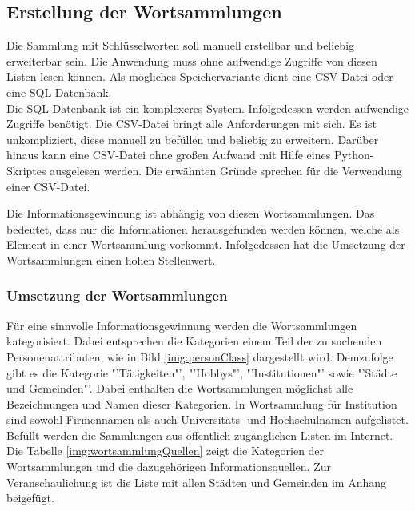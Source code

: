 	\subsection{Erstellung der Wortsammlungen}
	Die Sammlung mit Schlüsselworten soll manuell erstellbar und beliebig erweiterbar sein. Die Anwendung muss ohne aufwendige Zugriffe von diesen Listen lesen können. Als mögliches Speichervariante dient eine CSV-Datei oder eine SQL-Datenbank.\\
	Die SQL-Datenbank ist ein komplexeres System. Infolgedessen werden aufwendige Zugriffe benötigt. Die CSV-Datei bringt alle Anforderungen mit sich. Es ist unkompliziert, diese manuell zu befüllen und beliebig zu erweitern. Darüber hinaus kann eine CSV-Datei ohne großen Aufwand mit Hilfe eines Python-Skriptes ausgelesen werden. Die erwähnten Gründe sprechen für die Verwendung einer CSV-Datei.
	
	Die Informationsgewinnung ist abhängig von diesen Wortsammlungen. Das bedeutet, dass nur die Informationen herausgefunden werden können, welche als Element in einer Wortsammlung vorkommt. Infolgedessen hat die Umsetzung der Wortsammlungen einen hohen Stellenwert.
	
		
		\subsubsection{Umsetzung der Wortsammlungen}	
		Für eine sinnvolle Informationsgewinnung werden die Wortsammlungen kategorisiert. Dabei entsprechen die Kategorien einem Teil der zu suchenden Personenattributen, wie in Bild \ref{img:personClass} dargestellt wird. Demzufolge gibt es die Kategorie "'Tätigkeiten"', "'Hobbys"', "'Institutionen"' sowie "'Städte und Gemeinden"'. Dabei enthalten die Wortsammlungen möglichst alle Bezeichnungen und Namen dieser Kategorien. 
		In Wortsammlung für Institution sind sowohl Firmennamen als auch Universitäts- und Hochschulnamen aufgelistet. Befüllt werden die Sammlungen aus öffentlich zugänglichen Listen im Internet. Die Tabelle \ref{img:wortsammlungQuellen} zeigt die Kategorien der Wortsammlungen und die dazugehörigen Informationsquellen. Zur Veranschaulichung ist die Liste mit allen Städten und Gemeinden im Anhang beigefügt. \\%
		
